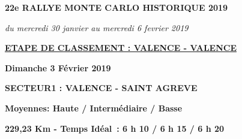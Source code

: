 \documentclass{article}%
\begin{document}
%
\normalsize%
\begin{center} \textbf{\LARGE{22e RALLYE MONTE CARLO HISTORIQUE 2019}} \end{center}%
\begin{center} \textit{du mercredi 30 janvier au mercredi 6 fevrier 2019} \end{center}%
\begin{center} \textbf{\underline{ETAPE DE CLASSEMENT : VALENCE - VALENCE							
}} \end{center}%
\begin{flushright} \textbf{Dimanche 3 Février 2019
} \end{flushright}%
\begin{flushleft} \textbf{SECTEUR1 : VALENCE - SAINT AGREVE} \end{flushleft}%
\begin{flushright} \textbf{             Moyennes: Haute / Intermédiaire / Basse
} \end{flushright}%
\begin{flushright} \textbf{229,23 Km - Temps Idéal : 6 h 10 / 6 h 15 / 6 h 20
} \end{flushright}%
\end{document}
